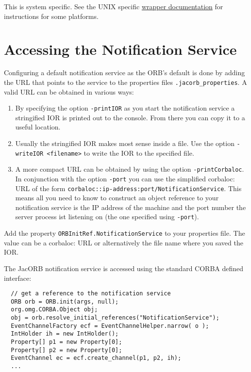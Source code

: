  This is system specific. See the UNIX specific
 \href{http://wrapper.tanukisoftware.org/doc/english/launch-nix.html}{wrapper
   documentation} for instructions for some platforms.

\section{Accessing the Notification Service}
\label{sec:access-notif-serv}

Configuring a default notification service as the ORB's default is done
by adding the URL that points to the service to the properties files
\texttt{.jacorb\_properties}. A valid URL can be obtained in various ways:

\begin{enumerate}
\item By specifying the option \texttt{-printIOR} as you start the
  notification service a stringified IOR is printed out to the
  console. From there you can copy it to a useful location.

\item Usually the stringified IOR makes most sense inside a file. Use
  the option \texttt{-writeIOR <filename>} to write the IOR to the specified
  file.

\item A more compact URL can be obtained by using the
  option \texttt{-printCorbaloc}. In conjunction with the option
  \texttt{-port} you can use the simplified corbaloc: URL of the form
  \texttt{corbaloc::ip-address:port/NotificationService}. This means
  all you need to know to construct an object reference to your
  notification service is the IP address of the machine and the port
  number the server process ist listening on (the one specified using
  \texttt{-port}). 

\end{enumerate}

Add the property \texttt{ORBInitRef.NotificationService} to your
properties file. The value can be a corbaloc: URL or alternatively the
file name where you saved the IOR.

The JacORB notification service is accessed using the standard CORBA
defined interface:

\small{
\begin{verbatim}
  // get a reference to the notification service
  ORB orb = ORB.init(args, null);
  org.omg.CORBA.Object obj; 
  obj = orb.resolve_initial_references("NotificationService");
  EventChannelFactory ecf = EventChannelHelper.narrow( o );
  IntHolder ih = new IntHolder();
  Property[] p1 = new Property[0];
  Property[] p2 = new Property[0];
  EventChannel ec = ecf.create_channel(p1, p2, ih);
  ...
\end{verbatim}
}

